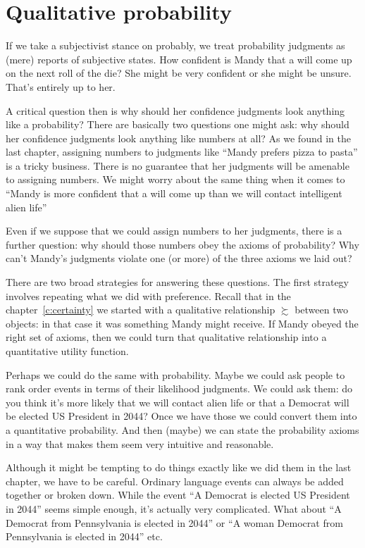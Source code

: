 \section{Qualitative probability}

If we take a subjectivist stance on probably, we treat probability judgments as (mere) reports of subjective states. How confident is Mandy that a  will come up on the next roll of the die?  She might be very confident or she might be unsure.  That's entirely up to her.

A critical question then is why should her confidence judgments look anything like a probability?  There are basically two questions one might ask: why should her confidence judgments look anything like numbers at all?  As we found in the last chapter, assigning numbers to judgments like ``Mandy prefers pizza to pasta'' is a tricky business.  There is no guarantee that her judgments will be amenable to assigning numbers.  We might worry about the same thing when it comes to ``Mandy is more confident that a  will come up than we will contact intelligent alien life''

Even if we suppose that we could assign numbers to her judgments, there is a further question: why should those numbers obey the axioms of probability? Why can't Mandy's judgments violate one (or more) of the three axioms we laid out?  

There are two broad strategies for answering these questions. The first strategy involves repeating what we did with preference.  Recall that in the chapter~\ref{c:certainty} we started with a qualitative relationship $\succsim$ between two objects: in that case it was something Mandy might receive.  If Mandy obeyed the right set of axioms, then we could turn that qualitative relationship into a quantitative utility function.

Perhaps we could do the same with probability. Maybe we could ask people to rank order events in terms of their likelihood judgments.  We could ask them: do you think it's more likely that we will contact alien life or that a Democrat will be elected US President in 2044?  Once we have those we could convert them into a quantitative probability.  And then (maybe) we can state the probability axioms in a way that makes them seem very intuitive and reasonable.

Although it might be tempting to do things exactly like we did them in the last chapter, we have to be careful.  Ordinary language events can always be added together or broken down.  While  the event ``A Democrat is elected US President in 2044'' seems simple enough, it's actually very complicated. What about ``A Democrat from Pennsylvania is elected in 2044'' or ``A woman Democrat from Pennsylvania is elected in 2044'' etc.

